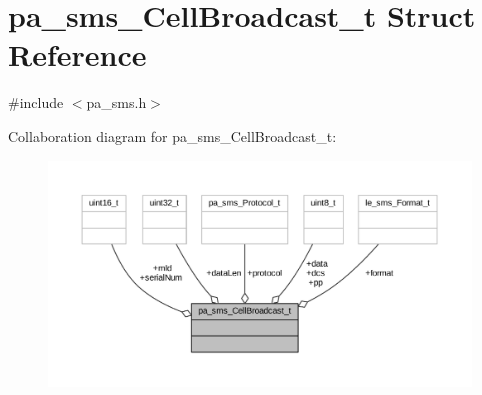 \hypertarget{structpa__sms___cell_broadcast__t}{}\section{pa\+\_\+sms\+\_\+\+Cell\+Broadcast\+\_\+t Struct Reference}
\label{structpa__sms___cell_broadcast__t}


{\ttfamily \#include $<$pa\+\_\+sms.\+h$>$}



Collaboration diagram for pa\+\_\+sms\+\_\+\+Cell\+Broadcast\+\_\+t\+:
\nopagebreak
\begin{figure}[H]
\begin{center}
\leavevmode
\includegraphics[width=350pt]{structpa__sms___cell_broadcast__t__coll__graph}
\end{center}
\end{figure}
